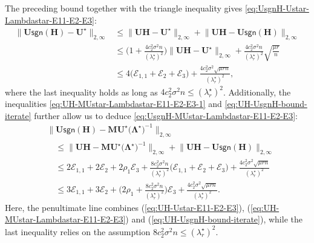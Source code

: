 The preceding bound
 together with the triangle inequality gives \eqref{eq:UsgnH-Ustar-Lambdastar-E11-E2-E3}:
%
\begin{align*}
\big\|\bm{U}\mathsf{sgn}(\bm{H})-\bm{U}^{\star}\big\|_{2,\infty} & \leq\big\|\bm{U}\bm{H}-\bm{U}^{\star}\big\|_{2,\infty}+\big\|\bm{U}\bm{H}-\bm{U}\mathsf{sgn}(\bm{H})\big\|_{2,\infty}\\
 & \leq\Big(1+\frac{4c_{2}^{2}\sigma^{2}n}{(\lambda_{r}^{\star})^{2}}\Big)\big\|\bm{U}\bm{H}-\bm{U}^{\star}\big\|_{2,\infty}+\frac{4c_{2}^{2}\sigma^{2}n}{(\lambda_{r}^{\star})^{2}}\sqrt{\frac{\mu r}{n}}\\
 & \leq4\big(\mathcal{E}_{1,1}+\mathcal{E}_{2}+\mathcal{E}_{3}\big)+\frac{4c_{2}^{2}\sigma^{2}\sqrt{\mu rn}}{(\lambda_{r}^{\star})^{2}},
\end{align*}
%
where the last inequality holds as long as $4c_{2}^{2}\sigma^{2}n\leq(\lambda_{r}^{\star})^{2}$. Additionally, the inequalities \eqref{eq:UH-MUstar-Lambdastar-E11-E2-E3-1} and \eqref{eq:UH-UsgnH-bound-iterate} further allow us to deduce \eqref{eq:UsgnH-MUstar-Lambdastar-E11-E2-E3}:
%
\begin{align*}
 & \big\|\bm{U}\mathsf{sgn}(\bm{H})-\bm{M}\bm{U}^{\star}\big(\bm{\Lambda}^{\star}\big)^{-1}\big\|_{2,\infty} \\
 & \quad \leq\big\|\bm{U}\bm{H}-\bm{M}\bm{U}^{\star}\big(\bm{\Lambda}^{\star}\big)^{-1}\big\|_{2,\infty}+\big\|\bm{U}\bm{H}-\bm{U}\mathsf{sgn}(\bm{H})\big\|_{2,\infty}\\
 & \quad\leq2\mathcal{E}_{1,1}+2\mathcal{E}_{2}+2\rho_{1}\mathcal{E}_{3}+\frac{8c_{2}^{2}\sigma^{2}n}{(\lambda_{r}^{\star})^{2}}\big(\mathcal{E}_{1,1}+\mathcal{E}_{2}+\mathcal{E}_{3}\big)+\frac{4c_{2}^{2}\sigma^{2}\sqrt{\mu rn}}{(\lambda_{r}^{\star})^{2}}\\
 & \quad\leq3\mathcal{E}_{1,1}+3\mathcal{E}_{2}+\Big(2\rho_{1}+\frac{8c_{2}^{2}\sigma^{2}n}{(\lambda_{r}^{\star})^{2}}\Big)\mathcal{E}_{3}+\frac{4c_{2}^{2}\sigma^{2}\sqrt{\mu rn}}{(\lambda_{r}^{\star})^{2}} .
\end{align*}
%
Here, the penultimate line combines (\ref{eq:UH-Ustar-E11-E2-E3}), (\ref{eq:UH-MUstar-Lambdastar-E11-E2-E3})
and (\ref{eq:UH-UsgnH-bound-iterate}), while the last inequality relies on the
assumption $8 c_{2}^{2}\sigma^{2}n\leq(\lambda_{r}^{\star})^{2}$.



